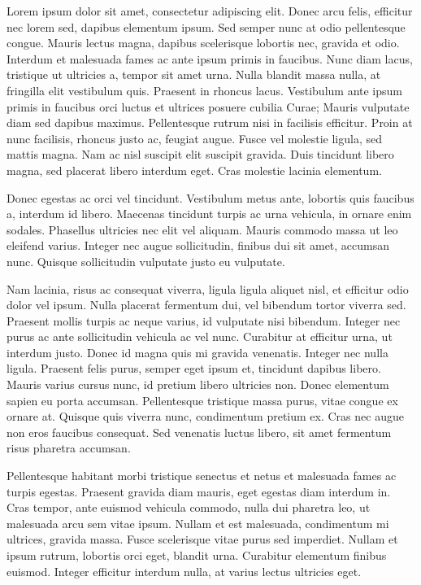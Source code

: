
Lorem ipsum dolor sit amet, consectetur adipiscing elit. Donec arcu felis, efficitur nec lorem sed, dapibus elementum ipsum. Sed semper nunc at odio pellentesque congue. Mauris lectus magna, dapibus scelerisque lobortis nec, gravida et odio. Interdum et malesuada fames ac ante ipsum primis in faucibus. Nunc diam lacus, tristique ut ultricies a, tempor sit amet urna. Nulla blandit massa nulla, at fringilla elit vestibulum quis. Praesent in rhoncus lacus. Vestibulum ante ipsum primis in faucibus orci luctus et ultrices posuere cubilia Curae; Mauris vulputate diam sed dapibus maximus. Pellentesque rutrum nisi in facilisis efficitur. Proin at nunc facilisis, rhoncus justo ac, feugiat augue. Fusce vel molestie ligula, sed mattis magna. Nam ac nisl suscipit elit suscipit gravida. Duis tincidunt libero magna, sed placerat libero interdum eget. Cras molestie lacinia elementum.

Donec egestas ac orci vel tincidunt. Vestibulum metus ante, lobortis quis faucibus a, interdum id libero. Maecenas tincidunt turpis ac urna vehicula, in ornare enim sodales. Phasellus ultricies nec elit vel aliquam. Mauris commodo massa ut leo eleifend varius. Integer nec augue sollicitudin, finibus dui sit amet, accumsan nunc. Quisque sollicitudin vulputate justo eu vulputate.

Nam lacinia, risus ac consequat viverra, ligula ligula aliquet nisl, et efficitur odio dolor vel ipsum. Nulla placerat fermentum dui, vel bibendum tortor viverra sed. Praesent mollis turpis ac neque varius, id vulputate nisi bibendum. Integer nec purus ac ante sollicitudin vehicula ac vel nunc. Curabitur at efficitur urna, ut interdum justo. Donec id magna quis mi gravida venenatis. Integer nec nulla ligula. Praesent felis purus, semper eget ipsum et, tincidunt dapibus libero. Mauris varius cursus nunc, id pretium libero ultricies non. Donec elementum sapien eu porta accumsan. Pellentesque tristique massa purus, vitae congue ex ornare at. Quisque quis viverra nunc, condimentum pretium ex. Cras nec augue non eros faucibus consequat. Sed venenatis luctus libero, sit amet fermentum risus pharetra accumsan.

Pellentesque habitant morbi tristique senectus et netus et malesuada fames ac turpis egestas. Praesent gravida diam mauris, eget egestas diam interdum in. Cras tempor, ante euismod vehicula commodo, nulla dui pharetra leo, ut malesuada arcu sem vitae ipsum. Nullam et est malesuada, condimentum mi ultrices, gravida massa. Fusce scelerisque vitae purus sed imperdiet. Nullam et ipsum rutrum, lobortis orci eget, blandit urna. Curabitur elementum finibus euismod. Integer efficitur interdum nulla, at varius lectus ultricies eget.

